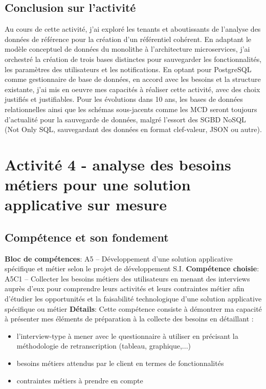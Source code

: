 \documentclass[a4paper, 11pt]{report}
\begin{document}
\subsection{Conclusion sur l'activité}
Au cours de cette activité, j'ai  exploré les tenants et aboutissants de l'analyse des données de référence pour la création d'un référentiel cohérent.
En adaptant le modèle conceptuel de données du monolithe à l'architecture microservices, j'ai orchestré la création de trois bases distinctes pour sauvegarder les fonctionnalités, les paramètres des utilisateurs et les notifications.
En optant pour PostgreSQL comme gestionnaire de base de données, en accord avec les besoins et la structure existante, j'ai mis en oeuvre mes capacités à réaliser cette activité, avec des choix justifiés et justifiables.
\newline
\newline
Pour les évolutions dans 10 ans, les bases de données relationnelles ainsi que les schémas sous-jacents comme les MCD seront toujours d'actualité pour la sauvegarde de données, malgré l'essort des SGBD NoSQL (Not Only SQL, sauvegardant des données en format clef-valeur, JSON ou autre).

\section{Activité 4 - analyse des besoins métiers pour une solution applicative sur mesure}
\subsection{Compétence et son fondement}
\textbf{Bloc de compétences}: A5 – Développement d’une solution applicative spécifique et métier selon le projet de développement S.I.
\newline
\textbf{Compétence choisie}: A5C1 – Collecter les besoins métiers des utilisateurs en menant des interviews auprès d’eux pour comprendre leurs activités et leurs contraintes métier afin d’étudier les opportunités et la faisabilité technologique d’une solution applicative spécifique ou métier
\newline
\textbf{Détails}: Cette compétence consiste à démontrer ma capacité à présenter mes éléments de préparation à la collecte des besoins en détaillant :
\begin{itemize}
  \item l’interview-type à mener avec le questionnaire à utiliser en précisant la méthodologie de retranscription (tableau, graphique,...)
  \item besoins métiers attendus par le client en termes de fonctionnalités
  \item contraintes métiers à prendre en compte
\end{itemize}
\end{document}
